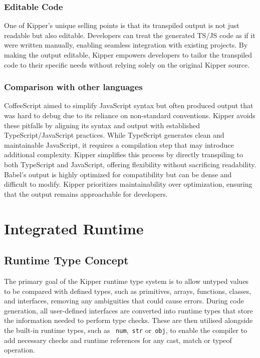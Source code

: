\subsubsection{Editable Code}
One of Kipper's unique selling points is that its transpiled output is not just readable but also editable. Developers can treat the generated TS/JS code as if it were written manually, enabling seamless integration with existing projects. By making the output editable, Kipper empowers developers to tailor the transpiled code to their specific needs without relying solely on the original Kipper source.

\subsubsection{Comparison with other languages}
CoffeeScript aimed to simplify JavaScript syntax but often produced output that was hard to debug due to its reliance on non-standard conventions. Kipper avoids these pitfalls by aligning its syntax and output with established TypeScript/JavaScript practices. While TypeScript generates clean and maintainable JavaScript, it requires a compilation step that may introduce additional complexity. Kipper simplifies this process by directly transpiling to both TypeScript and JavaScript, offering flexibility without sacrificing readability. Babel's output is highly optimized for compatibility but can be dense and difficult to modify. Kipper prioritizes maintainability over optimization, ensuring that the output remains approachable for developers.

\section{Integrated Runtime}
\label{sec:integrated-runtime}

\subsection{Runtime Type Concept}

The primary goal of the Kipper runtime type system is to allow untyped values to be compared with defined types, such as primitives, arrays, functions, classes, and interfaces, removing any ambiguities that could cause errors. During code generation, all user-defined interfaces are converted into runtime types that store the information needed to perform type checks. These are then utilised alongside the built-in runtime types, such as ~\lstinline|num|,~\lstinline|str| or~\lstinline|obj|, to enable the compiler to add necessary checks and runtime references for any cast, match or typeof operation.

